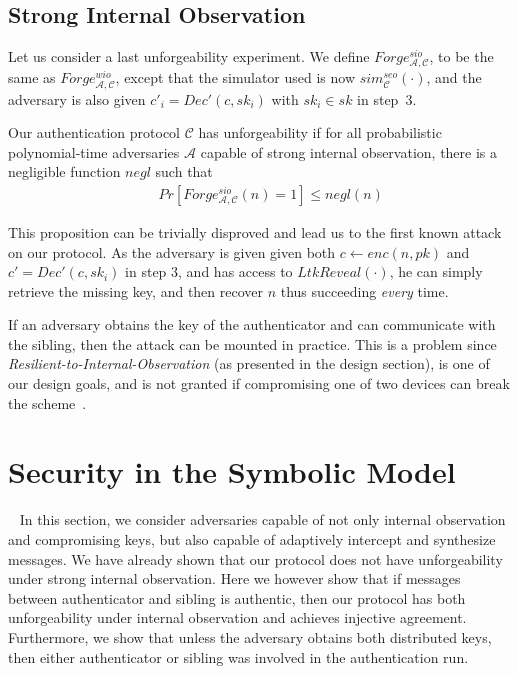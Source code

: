 \subsection{Strong Internal Observation}

Let us consider a last unforgeability experiment. We define $Forge^{sio}_{\mathcal{A}, \mathcal{C}}$, to be the same as $Forge^{wio}_{\mathcal{A}, \mathcal{C}}$, except that the simulator used is now $sim^{seo}_\mathcal{C}(\cdot)$, and the adversary is also given $c'_i = Dec'(c, sk_{i})$ with $sk_i \in sk$ in step~3.


\begin{proposition}\label{proposition:forge-rev-in}
Our authentication protocol $\mathcal{C}$ has unforgeability if for all probabilistic polynomial-time adversaries $\mathcal{A}$ capable of strong internal observation, there is a negligible function $negl$ such that
{\setlength{\mathindent}{0cm}
\begin{align*}
&&    Pr\left[ Forge^{sio}_{\mathcal{A}, \mathcal{C}}(n)  = 1 \right] \leq negl(n) 
\end{align*}}
\end{proposition}

This proposition can be trivially disproved and lead us to the first known attack on our protocol. As the adversary is given given both $c \leftarrow enc(n, pk)$ and $c' = Dec'(c, sk_{i})$ in step 3, and has access to $LtkReveal(\cdot)$, he can simply retrieve the missing key, and then recover $n$ thus succeeding \textit{every} time.

If an adversary obtains the key of the authenticator and can communicate with the sibling, then the attack can be mounted in practice. This is a problem since \textit{Resilient-to-Internal-Observation} (as presented in the design section), is one of our design goals, and is not granted if compromising one of two devices can break the scheme~\cite{bonneau2012quest}.

\section{Security in the Symbolic Model}~\label{sec:tamarin}
In this section, we consider adversaries capable of not only internal observation and compromising keys, but also capable of adaptively intercept and synthesize messages. We have already shown that our protocol does not have unforgeability under strong internal observation. Here we however show that if messages between \gls{authenticator} and \gls{sibling} is authentic, then
our protocol has both unforgeability under internal observation and achieves injective agreement. Furthermore, we show that unless the adversary obtains both distributed keys, then either \gls{authenticator} or \gls{sibling} was involved in the authentication run.

